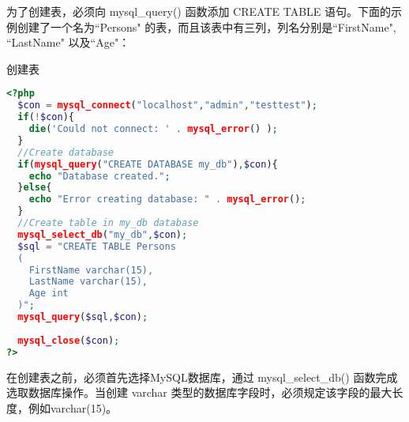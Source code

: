 为了创建表，必须向 mysql\_query() 函数添加 CREATE TABLE 语句。下面的示例创建了一个名为``Persons" 的表，而且该表中有三列，列名分别是``FirstName", ``LastName" 以及``Age"：




\begin{example}
创建表
\begin{lstlisting}[language=PHP]
<?php
  $con = mysql_connect("localhost","admin","testtest");
  if(!$con){
    die('Could not connect: ' . mysql_error() );
  }
  //Create database
  if(mysql_query("CREATE DATABASE my_db"),$con){
    echo "Database created.";
  }else{
    echo "Error creating database: " . mysql_error();
  }
  //Create table in my_db database
  mysql_select_db("my_db",$con);
  $sql = "CREATE TABLE Persons
  (
    FirstName varchar(15),
    LastName varchar(15),
    Age int
  )";
  mysql_query($sql,$con);
  
  mysql_close($con);
?>
\end{lstlisting}
\end{example}


在创建表之前，必须首先选择MySQL数据库，通过 mysql\_select\_db() 函数完成选取数据库操作。当创建 varchar 类型的数据库字段时，必须规定该字段的最大长度，例如varchar(15)。


